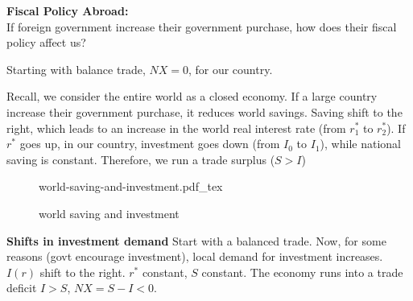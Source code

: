 \documentclass[12pt]{article}
\newcommand{\incfig}[1]{%
\def\svgwidth{\columnwidth}
{#1.pdf_tex}
}
\begin{document}
\begin{figure}[H]
\end{figure}




{\textbf {Fiscal Policy Abroad:}}\\
If foreign government increase their government purchase, how does their fiscal
policy affect us?

Starting with balance trade, $ NX = 0 $, for our country.

Recall, we consider the entire world as a closed economy. 
If a large country increase their government purchase, it reduces world savings.
Saving shift to the right, which leads to an increase in the world real interest rate
(from $ r_1^{*} $ to $ r_2^{*} $).
If $ r^{*} $ goes up, in our country, investment goes down (from $ I_0 $ to $ I_1 $),
while national saving
is constant. Therefore, we run a trade surplus ($ S > I $)

\begin{figure}[ht]
    \centering
    \incfig{world-saving-and-investment}
    \caption{world saving and investment}
    \label{fig:world-saving-and-investment}
\end{figure}



{\textbf {Shifts in investment demand}}
Start with a balanced trade.
Now, for some reasons (govt encourage investment), local demand for investment 
increases. $ I(r) $ shift to the right. $ r^{*} $ constant, $ S $ constant.
The economy runs into a trade deficit $ I > S $, $ NX = S - I < 0 $. 
\end{document}
